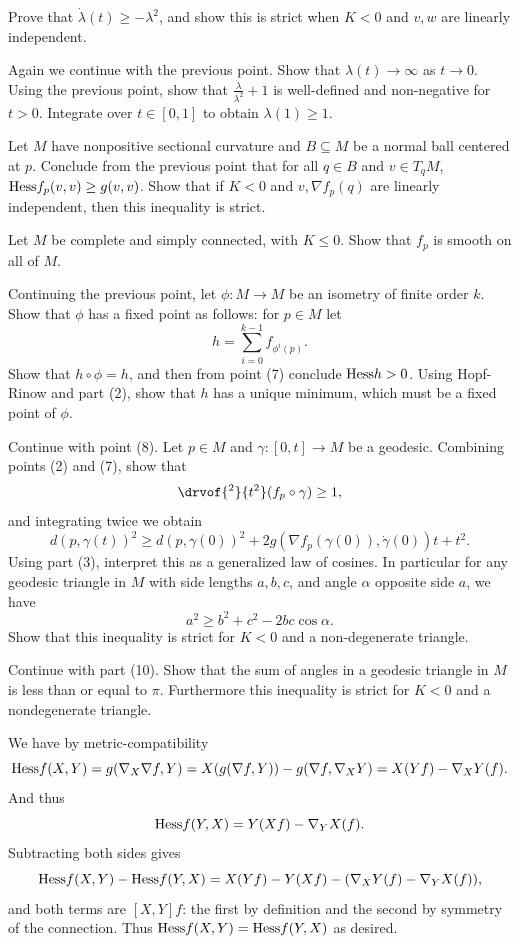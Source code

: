         Prove that $\dot\lambda(t)\geq-\lambda^2$, and show this is strict when $K<0$ and $v,w$ are linearly independent.
        \item Again we continue with the previous point.
        Show that $\lambda(t)\to\infty$ as $t\to0$.
        Using the previous point, show that $\frac{\dot\lambda}{\lambda^2}+1$ is well-defined and non-negative for $t>0$.
        Integrate over $t\in[0,1]$ to obtain $\lambda(1)\geq1$.
        \item Let $M$ have nonpositive sectional curvature and $B\subseteq M$ be a normal ball centered at $p$.
        Conclude from the previous point that for all $q\in B$ and $v\in T_qM$, ${\rm Hess} f_p(v,v)\geq g(v,v)$.
        Show that if $K<0$ and $v,\nabla f_p(q)$ are linearly independent, then this inequality is strict.
        \item Let $M$ be complete and simply connected, with $K\leq0$.
        Show that $f_p$ is smooth on all of $M$.
        \item Continuing the previous point, let $\phi\colon M\to M$ be an isometry of finite order $k$.
        Show that $\phi$ has a fixed point as follows: for $p\in M$ let
        $$ h = \sum_{i=0}^{k-1}f_{\phi^i(p)} . $$
        Show that $h\circ\phi=h$, and then from point (7) conclude ${\rm Hess} h>0$.
        Using Hopf-Rinow and part (2), show that $h$ has a unique minimum, which must be a fixed point of $\phi$.
        \item Continue with point (8).
        Let $p\in M$ and $\gamma\colon[0,t]\to M$ be a geodesic.
        Combining points (2) and (7), show that
        $$ \drvof{^2}{t^2}(f_p\circ\gamma) \geq 1, $$
        and integrating twice we obtain
        $$ d(p,\gamma(t))^2 \geq d(p,\gamma(0))^2 + 2g(\nabla f_p(\gamma(0)),\dot\gamma(0))t + t^2 . $$
        Using part (3), interpret this as a generalized law of cosines.
        In particular for any geodesic triangle in $M$ with side lengths $a,b,c$, and angle $\alpha$ opposite
        side $a$, we have
        $$ a^2 \geq b^2 + c^2 - 2bc\cos\alpha . $$
        Show that this inequality is strict for $K<0$ and a non-degenerate triangle.
        \item Continue with part (10).
        Show that the sum of angles in a geodesic triangle in $M$ is less than or equal to $\pi$.
        Furthermore this inequality is strict for $K<0$ and a nondegenerate triangle.
    \eenum

\eprob

\benum
    \item We have by metric-compatibility
    $$ {\rm Hess} f(X,Y) = g(\nabla_X\nabla f,Y) = X(g(\nabla f,Y)) - g(\nabla f,\nabla_XY) = X(Yf) - \nabla_XY(f) . $$
    And thus
    $$ {\rm Hess} f(Y,X) = Y(Xf) - \nabla_YX(f) . $$
    Subtracting both sides gives
    $$ {\rm Hess} f(X,Y) - {\rm Hess} f(Y,X) = X(Yf) - Y(Xf) - (\nabla_XY(f) - \nabla_YX(f)) , $$
    and both terms are $[X,Y]f$: the first by definition and the second by symmetry of the connection.
    Thus ${\rm Hess} f(X,Y)={\rm Hess} f(Y,X)$ as desired.

